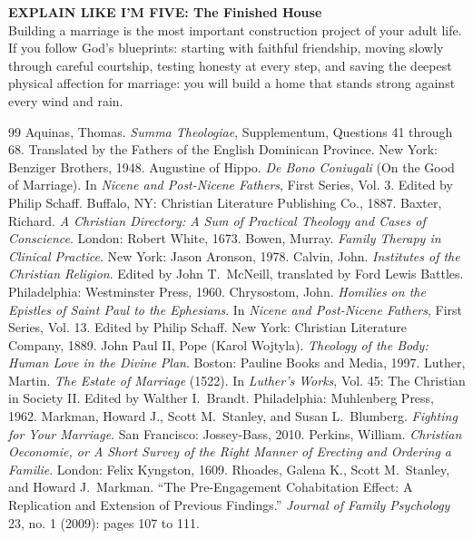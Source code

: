\documentclass[11pt,twocolumn]{article}
\begin{document}
\begin{eli5box}
\textbf{EXPLAIN LIKE I'M FIVE: The Finished House}\\
Building a marriage is the most important construction project of your adult life. If you follow God's blueprints: starting with faithful friendship, moving slowly through careful courtship, testing honesty at every step, and saving the deepest physical affection for marriage: you will build a home that stands strong against every wind and rain.
\end{eli5box}

\begin{thebibliography}{99}
 Aquinas, Thomas. \textit{Summa Theologiae}, Supplementum, Questions 41 through 68. Translated by the Fathers of the English Dominican Province. New York: Benziger Brothers, 1948.
 Augustine of Hippo. \textit{De Bono Coniugali} (On the Good of Marriage). In \textit{Nicene and Post-Nicene Fathers}, First Series, Vol. 3. Edited by Philip Schaff. Buffalo, NY: Christian Literature Publishing Co., 1887.
 Baxter, Richard. \textit{A Christian Directory: A Sum of Practical Theology and Cases of Conscience}. London: Robert White, 1673.
 Bowen, Murray. \textit{Family Therapy in Clinical Practice}. New York: Jason Aronson, 1978.
 Calvin, John. \textit{Institutes of the Christian Religion}. Edited by John T.~McNeill, translated by Ford Lewis Battles. Philadelphia: Westminster Press, 1960.
 Chrysostom, John. \textit{Homilies on the Epistles of Saint Paul to the Ephesians}. In \textit{Nicene and Post-Nicene Fathers}, First Series, Vol. 13. Edited by Philip Schaff. New York: Christian Literature Company, 1889.
 John Paul II, Pope (Karol Wojtyla). \textit{Theology of the Body: Human Love in the Divine Plan}. Boston: Pauline Books and Media, 1997.
 Luther, Martin. \textit{The Estate of Marriage} (1522). In \textit{Luther's Works}, Vol. 45: The Christian in Society II. Edited by Walther I.~Brandt. Philadelphia: Muhlenberg Press, 1962.
 Markman, Howard J., Scott M.~Stanley, and Susan L.~Blumberg. \textit{Fighting for Your Marriage}. San Francisco: Jossey-Bass, 2010.
 Perkins, William. \textit{Christian Oeconomie, or A Short Survey of the Right Manner of Erecting and Ordering a Familie}. London: Felix Kyngston, 1609.
 Rhoades, Galena K., Scott M.~Stanley, and Howard J.~Markman. ``The Pre-Engagement Cohabitation Effect: A Replication and Extension of Previous Findings.'' \textit{Journal of Family Psychology} 23, no. 1 (2009): pages 107 to 111.

\end{thebibliography}
\end{document}
